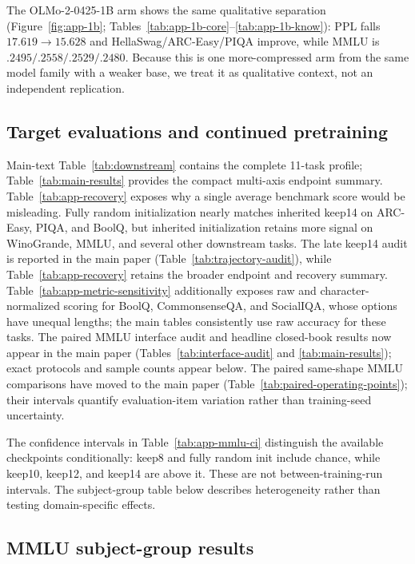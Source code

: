 The OLMo-2-0425-1B arm shows the same qualitative separation
(Figure~\ref{fig:app-1b}; Tables~\ref{tab:app-1b-core}--\ref{tab:app-1b-know}):
PPL falls $17.619\to15.628$ and HellaSwag/ARC-Easy/PIQA improve, while MMLU is
$.2495/.2558/.2529/.2480$. Because this is one more-compressed arm from the same
model family with a weaker base, we treat it as qualitative context, not an
independent replication.



\subsection{Target evaluations and continued pretraining}
\label{app:recovery}




Main-text Table~\ref{tab:downstream} contains the complete 11-task profile;
Table~\ref{tab:main-results} provides the compact multi-axis endpoint summary.
Table~\ref{tab:app-recovery} exposes why a single average benchmark score would
be misleading. Fully random initialization nearly matches inherited keep14 on
ARC-Easy, PIQA, and BoolQ, but inherited initialization retains more signal on
WinoGrande, MMLU, and several other downstream tasks. The late keep14 audit is
reported in the main paper (Table~\ref{tab:trajectory-audit}), while
Table~\ref{tab:app-recovery} retains the broader endpoint and recovery summary.
Table~\ref{tab:app-metric-sensitivity} additionally exposes raw and
character-normalized scoring for BoolQ, CommonsenseQA, and SocialIQA,
whose options have unequal lengths; the main tables consistently use raw
accuracy for these tasks. The paired MMLU interface audit and headline
closed-book results now appear in the main paper
(Tables~\ref{tab:interface-audit} and \ref{tab:main-results}); exact protocols
and sample counts appear below.
The paired same-shape MMLU comparisons have moved to the main paper
(Table~\ref{tab:paired-operating-points}); their intervals quantify
evaluation-item variation rather than training-seed uncertainty.

The confidence intervals in Table~\ref{tab:app-mmlu-ci} distinguish the
available checkpoints conditionally: keep8 and fully random init include
chance, while keep10, keep12, and keep14 are above it. These are not
between-training-run intervals. The subject-group table below describes
heterogeneity rather than testing domain-specific effects.

\subsection{MMLU subject-group results}
\label{app:mmlu-subjects}

